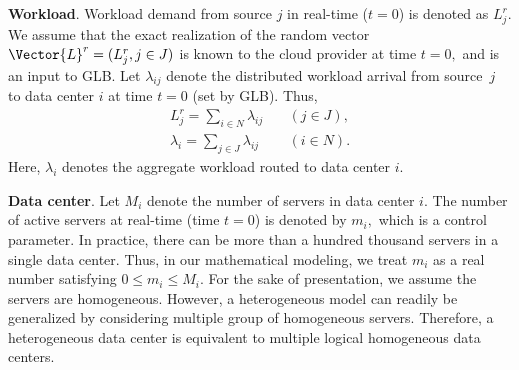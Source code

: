 




\textbf{Workload}. Workload demand from source $j$ in real-time ($t = 0$) is denoted as $L^r_j.$ We assume that the exact realization of the random vector $\Vector{L}^r = (L^r_j,j \in J)$ is known to the cloud provider at time $t = 0,$ and is an input to GLB. Let $\lambda_{ij}$ denote the distributed workload arrival from source~$j$ to data center $i$ at time $t = 0$ (set by GLB). Thus,
\begin{eqnarray*}
	\label{eq:constraintWorkload1}
	L^r_j = \sum_{i\in N}^{}\lambda_{ij}  & \quad (j\in J), \\
	\label{eq:constraintWorkload2}
	\lambda_i = \sum_{j\in J}^{}\lambda_{ij} & \quad (i \in N).
\end{eqnarray*}
Here, $\lambda_i$ denotes the aggregate workload routed to data center $i.$

\textbf{Data center}. Let $M_i$ denote the number of servers in data
center $i$. The number of active servers at real-time (time $t=0$) is
denoted by $m_i,$ which is a control parameter. In practice, there can
be more than a hundred thousand servers in a single data center. Thus,
in our mathematical modeling, we treat $m_i$ as a real number
satisfying $0 \leq m_i \leq M_i.$ For the sake of presentation, we assume the servers are homogeneous.
However, a heterogeneous model can readily be generalized by considering multiple group of homogeneous servers.
Therefore, a heterogeneous data center is equivalent to multiple logical homogeneous data centers.

